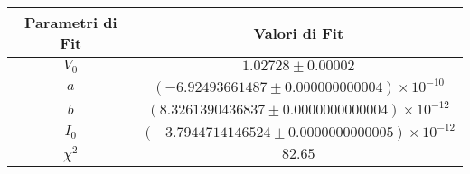 \begin{tabular}{cc}
\hline
	Parametri di Fit & Valori di Fit\\ 
\hline
	$V_0$ & $1.02728\pm0.00002$ \\
	$a$ & $(-6.92493661487\pm0.000000000004)\times 10^{-10}$ \\
	$b$ & $(8.3261390436837\pm0.0000000000004)\times 10^{-12}$ \\
	$I_0$ & $(-3.7944714146524\pm0.0000000000005)\times 10^{-12}$ \\
	$\chi^2$ & $82.65$ \\
\hline
\end{tabular}
